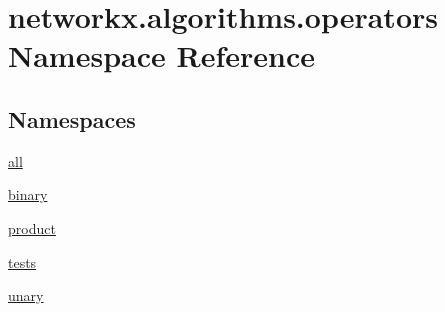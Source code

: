 \hypertarget{namespacenetworkx_1_1algorithms_1_1operators}{}\section{networkx.\+algorithms.\+operators Namespace Reference}
\label{namespacenetworkx_1_1algorithms_1_1operators}
\subsection*{Namespaces}
\begin{DoxyCompactItemize}
\item 
 \hyperlink{namespacenetworkx_1_1algorithms_1_1operators_1_1all}{all}
\item 
 \hyperlink{namespacenetworkx_1_1algorithms_1_1operators_1_1binary}{binary}
\item 
 \hyperlink{namespacenetworkx_1_1algorithms_1_1operators_1_1product}{product}
\item 
 \hyperlink{namespacenetworkx_1_1algorithms_1_1operators_1_1tests}{tests}
\item 
 \hyperlink{namespacenetworkx_1_1algorithms_1_1operators_1_1unary}{unary}
\end{DoxyCompactItemize}
